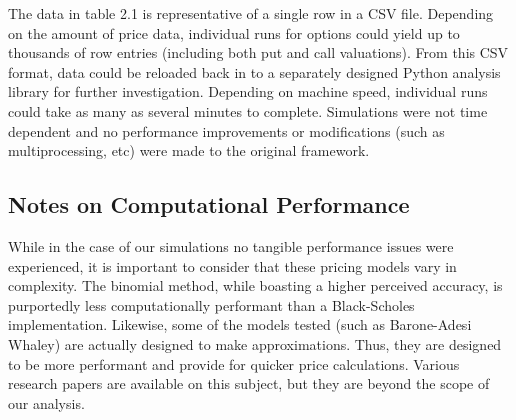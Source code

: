 The data in table 2.1 is representative of a single row in a CSV file. Depending on the amount of price data, individual runs for options could yield up to thousands of row entries (including both put and call valuations). From this CSV format, data could be reloaded back in to a separately designed Python analysis library for further investigation. Depending on machine speed, individual runs could take as many as several minutes to complete. Simulations were not time dependent and no performance improvements or modifications (such as multiprocessing, etc) were made to the original framework. 

\subsection{Notes on Computational Performance}
While in the case of our simulations no tangible performance issues were experienced, it is important to consider that these pricing models vary in complexity. The binomial method, while boasting a higher perceived accuracy, is purportedly less computationally performant than a Black-Scholes implementation. Likewise, some of the models tested (such as Barone-Adesi Whaley) are actually designed to make approximations. Thus, they are designed to be more performant and provide for quicker price calculations. Various research papers are available on this subject, but they are beyond the scope of our analysis.